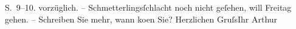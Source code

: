 \begin{ledgroupsized}[t]{13cm}
{{{                            S. 9–10.}}}\label{K_L00380_3h} vorzüglich. –\pend
           \pstart
           Schmetterlingsſchlacht noch nicht geſehen,
                    will Freitag gehen. – Schreiben Sie mehr, wann ko{\geminationm}en Sie?\pend
           \pstart Herzlichen Gruſs\hspace*{1.5em}Ihr
                        \spacefill\mbox{Arthur}\pend{}\endnumbering{}\end{ledgroupsized}  \newcommand{\dateiname}{L00380}\newcommand{\titel}{Arthur Schnitzler an Richard Beer-Hofmann, 9. 10. 1894}\newcommand{\editorInnen}{ Martin Anton Müller und Gerd-Hermann Susen}
            \footnotesize
\begin{ledgroupsized}[t]{11.5cm}
\end{ledgroupsized}
         
      